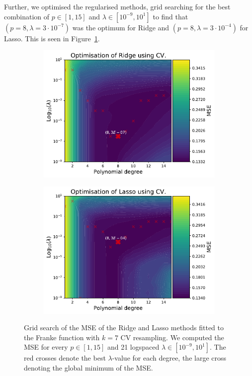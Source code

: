 \documentclass[twocolumn,english,notitlepage]{article}
\begin{document}
        Further, we optimised the regularised methods, grid searching for the best combination of $p\in [1,15]$ and $\lambda \in [10^{-9}, 10^{1}]$ to find that $(p=8, \lambda=3\cdot 10^{-7})$ was the optimum for Ridge and $(p=8, \lambda=3\cdot 10^{-4})$ for Lasso. This is seen in Figure~\ref{res:fig:Franke_heatmaps}.

        \begin{figure}[ht]
            \begin{subfigure}{\linewidth}
                \centering
                \includegraphics[width=.9\linewidth]{heatmap_ridge.pdf}
            \end{subfigure}
            \begin{subfigure}{\linewidth}
                \centering
                \includegraphics[width=.9\linewidth]{heatmap_lasso.pdf}
            \end{subfigure}
            \caption{Grid search of the MSE of the Ridge and Lasso methods fitted to the Franke function with $k=7$ CV resampling. We computed the MSE for every $p \in [1,15]$ and 21 logspaced $\lambda \in [10^{-9}, 10^1]$. The red crosses denote the best $\lambda$-value for each degree, the large cross denoting the global minimum of the MSE.}
            \label{res:fig:Franke_heatmaps}
        \end{figure}
\end{document}
